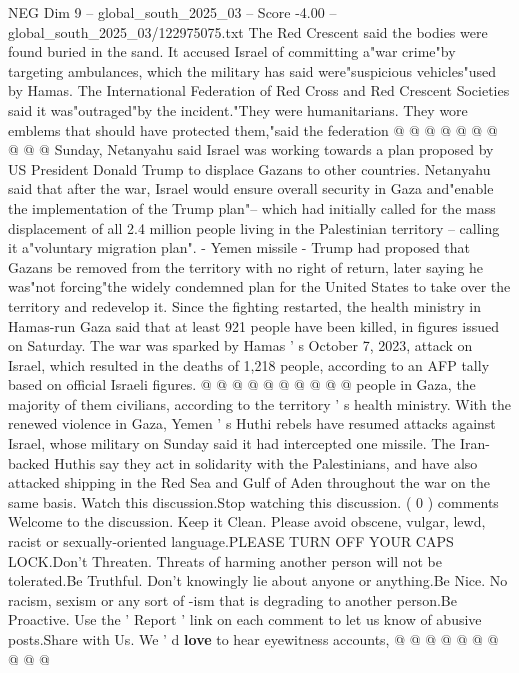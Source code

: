 \begin{textsample}{NEG Dim 9 – global\_south\_2025\_03 – Score -4.00 – global\_south\_2025\_03/122975075.txt}
The Red Crescent said the bodies were found buried in the sand.
It accused Israel of committing a"war crime"by targeting ambulances, which the military has said were"suspicious vehicles"used by Hamas.
The International Federation of Red Cross and Red Crescent Societies said it was"outraged"by the incident."They were humanitarians.
They wore emblems that should have protected them,"said the federation @ @ @ @ @ @ @ @ @ @ Sunday, Netanyahu said Israel was working towards a plan proposed by US President Donald Trump to displace Gazans to other countries.
Netanyahu said that after the war, Israel would ensure overall security in Gaza and"enable the implementation of the Trump plan"-- which had initially called for the mass displacement of all 2.4 million people living in the Palestinian territory -- calling it a"voluntary migration plan". - Yemen missile - Trump had proposed that Gazans be removed from the territory with no right of return, later saying he was"not forcing"the widely condemned plan for the United States to take over the territory and redevelop it.
Since the fighting restarted, the health ministry in Hamas-run Gaza said that at least 921 people have been killed, in figures issued on Saturday.
The war was sparked by Hamas ' s October 7, 2023, attack on Israel, which resulted in the deaths of 1,218 people, according to an AFP tally based on official Israeli figures. @ @ @ @ @ @ @ @ @ @ people in Gaza, the majority of them civilians, according to the territory ' s health ministry.
With the renewed violence in Gaza, Yemen ' s Huthi rebels have resumed attacks against Israel, whose military on Sunday said it had intercepted one missile.
The Iran-backed Huthis say they act in solidarity with the Palestinians, and have also attacked shipping in the Red Sea and Gulf of Aden throughout the war on the same basis.
Watch this discussion.Stop watching this discussion. ( 0 ) comments Welcome to the discussion.
Keep it Clean.
Please avoid obscene, vulgar, lewd, racist or sexually-oriented language.PLEASE TURN OFF YOUR CAPS LOCK.Don't Threaten.
Threats of harming another person will not be tolerated.Be Truthful.
Don't knowingly lie about anyone or anything.Be Nice.
No racism, sexism or any sort of -ism that is degrading to another person.Be Proactive.
Use the ' Report ' link on each comment to let us know of abusive posts.Share with Us.
We ' d \textbf{love} to hear eyewitness accounts, @ @ @ @ @ @ @ @ @ @

\end{textsample}
